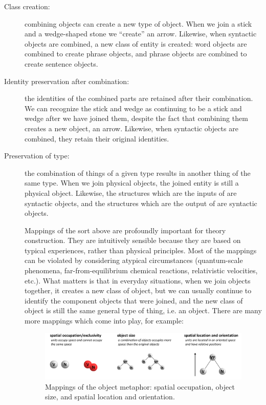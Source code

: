 \begin{description}
\item[Class creation:] combining objects can create a new type of object. When we join a stick and a wedge-shaped stone we “create” an arrow. Likewise, when syntactic objects are combined, a new class of entity is created: word objects are combined to create phrase objects, and phrase objects are combined to create sentence objects. 

\item[Identity preservation after combination:] the identities of the combined parts are retained after their combination. We can recognize the stick and wedge as continuing to be a stick and wedge after we have joined them, despite the fact that combining them creates a new object, an arrow. Likewise, when syntactic objects are combined, they retain their original identities.

\item[Preservation of type:] the combination of things of a given type results in another thing of the same type. When we join physical objects, the joined entity is still a physical object. Likewise, the structures which are the inputs of {} are syntactic objects, and the structures which are the output of {} are syntactic objects.

Mappings of the sort above are profoundly important for theory construction. They are intuitively sensible because they are based on typical experiences, rather than physical principles. Most of the mappings can be violated by considering atypical circumstances (quantum-scale phenomena, far-from-equilibrium chemical reactions, relativistic velocities, etc.). What matters is that in everyday situations, when we join objects together, it creates a new class of object, but we can usually continue to identify the component objects that were joined, and the new class of object is still the same general type of thing, i.e. an object. There are many more mappings which come into play, for example:
  
\begin{figure}[H]
\includegraphics[width=\textwidth]{figures/Tilsen-img30.png}
\caption{Mappings of the object metaphor: spatial occupation, object size, and spatial location and orientation.}
\label{fig:3:2}
\end{figure}
 


\end{description}
